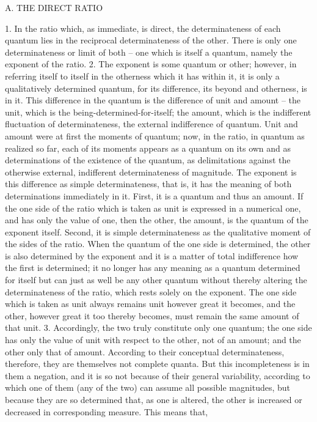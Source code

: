 A. THE DIRECT RATIO

1. In the ratio which, as immediate, is direct, the determinateness of each
quantum lies in the reciprocal determinateness of the other. There is only
one determinateness or limit of both – one which is itself a quantum, namely
the exponent of the ratio.
2. The exponent is some quantum or other; however, in referring itself
to itself in the otherness which it has within it, it is only a qualitatively
determined quantum, for its difference, its beyond and otherness, is in
it. This difference in the quantum is the difference of unit and amount –
the unit, which is the being-determined-for-itself; the amount, which is
the indifferent fluctuation of determinateness, the external indifference of
quantum. Unit and amount were at first the moments of quantum; now,
in the ratio, in quantum as realized so far, each of its moments appears as a
quantum on its own and as determinations of the existence of the quantum,
as delimitations against the otherwise external, indifferent determinateness
of magnitude.
The exponent is this difference as simple determinateness, that is, it
has the meaning of both determinations immediately in it. First, it is a
quantum and thus an amount. If the one side of the ratio which is taken as
unit is expressed in a numerical one, and has only the value of one, then the
other, the amount, is the quantum of the exponent itself. Second, it is simple
determinateness as the qualitative moment of the sides of the ratio. When
the quantum of the one side is determined, the other is also determined
by the exponent and it is a matter of total indifference how the first is
determined; it no longer has any meaning as a quantum determined for
itself but can just as well be any other quantum without thereby altering the
determinateness of the ratio, which rests solely on the exponent. The one
side which is taken as unit always remains unit however great it becomes,
and the other, however great it too thereby becomes, must remain the same
amount of that unit.
3. Accordingly, the two truly constitute only one quantum; the one side
has only the value of unit with respect to the other, not of an amount; and
the other only that of amount. According to their conceptual determinateness,
therefore, they are themselves not complete quanta. But this incompleteness
is in them a negation, and it is so not because of their general variability,
according to which one of them (any of the two) can assume all possible
magnitudes, but because they are so determined that, as one is altered, the
other is increased or decreased in corresponding measure. This means that,
